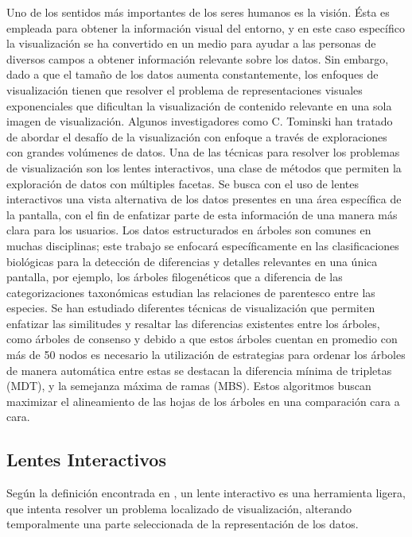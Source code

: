 \documentclass[journal]{IEEEtran}
\begin{document}
Uno de los sentidos más importantes de los seres humanos es la visión. 
Ésta es empleada para obtener la información visual del entorno, y en este caso específico la visualización se ha
 convertido en un medio para ayudar a las personas de diversos campos a obtener información relevante sobre los datos. 
 Sin embargo, dado a que el tamaño de los datos aumenta constantemente,
  los enfoques de visualización tienen que resolver el problema de representaciones visuales 
  exponenciales que dificultan la visualización de contenido relevante en una sola imagen de visualización\cite{tominski_gladisch_kister_dachselt_schumann_2016}.
Algunos investigadores como C. Tominski han tratado de abordar el desafío de la visualización con enfoque a través de exploraciones con grandes volúmenes 
de datos. Una de las técnicas para resolver los problemas de visualización son los lentes interactivos,
 una clase de métodos que permiten la exploración de datos con múltiples facetas. 
 Se busca con el uso de lentes interactivos una vista alternativa de los datos presentes en una área 
 específica de la pantalla, con el fin de enfatizar parte de esta información de una manera más clara para los usuarios\cite{tominski_gladisch_kister_dachselt_schumann_2016}.
Los datos estructurados en árboles son comunes en muchas disciplinas; este trabajo se enfocará 
específicamente en las clasificaciones biológicas para la detección de diferencias y detalles relevantes 
en una única pantalla, por ejemplo, los árboles filogenéticos que a diferencia de las categorizaciones 
taxonómicas estudian las relaciones de parentesco entre las especies.
Se han estudiado diferentes técnicas de visualización que permiten enfatizar las similitudes 
y resaltar las diferencias existentes entre los árboles, como árboles de consenso y debido a que estos 
árboles cuentan en promedio con más de 50 nodos es necesario la utilización de estrategias para ordenar 
los árboles de manera automática entre estas se destacan la diferencia mínima de tripletas (MDT), y la
 semejanza máxima de ramas (MBS). Estos algoritmos buscan maximizar el alineamiento de las hojas de los 
 árboles en una comparación cara a cara\cite{inproceedings}.


 \subsection{Lentes Interactivos}

 Según la definición encontrada en \cite{tominski_gladisch_kister_dachselt_schumann_2016}, un lente interactivo es una herramienta ligera, que
 intenta resolver un problema localizado de visualización, alterando temporalmente una parte seleccionada de la representación de los datos.
\end{document}

